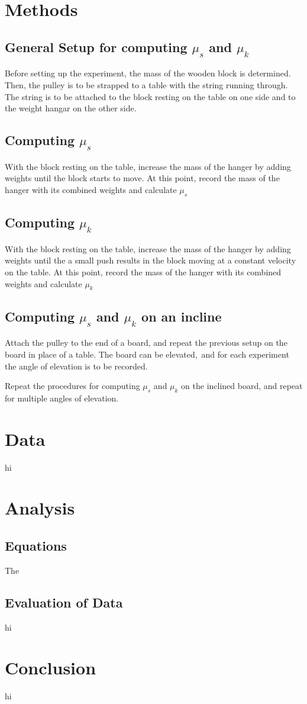 \documentclass[12pt]{article}
\begin{document}
    \section{Methods}
        \subsection{General Setup for computing $\mu_s$ and $\mu_k$}
            Before setting up the experiment, the mass of the wooden block is 
            determined. Then, the pulley is to be strapped to a table with the
            string running through. The string is to be attached to the block
            resting on the table on one side and to the weight hangar on the 
            other side.
        \subsection{Computing $\mu_s$}
            With the block resting on the table, increase the mass of
            the hanger by adding weights until the block starts to move.
            At this point, record the mass of the hanger with its combined 
            weights and calculate $\mu_s$
        \subsection{Computing $\mu_k$}
            With the block resting on the table, increase the mass of
            the hanger by adding weights until the a small push results
            in the block moving at a constant velocity on the table.
            At this point, record the mass of the hanger with its combined 
            weights and calculate $\mu_k$
        \subsection{Computing $\mu_s$ and $\mu_k$ on an incline}
            \par Attach the pulley to the end of a board, and repeat the previous 
            setup on the board in place of a table. The board can be elevated,\
            and for each experiment the angle of elevation is to be recorded.
            \par Repeat the procedures for computing $\mu_s$ and $\mu_k$ on the
            inclined board, and repeat for multiple angles of elevation.
    \section{Data}
        hi
    \section{Analysis}
        \subsection{Equations}
            The 
        \subsection{Evaluation of Data}
            hi
    \section{Conclusion}
        hi
\end{document}

